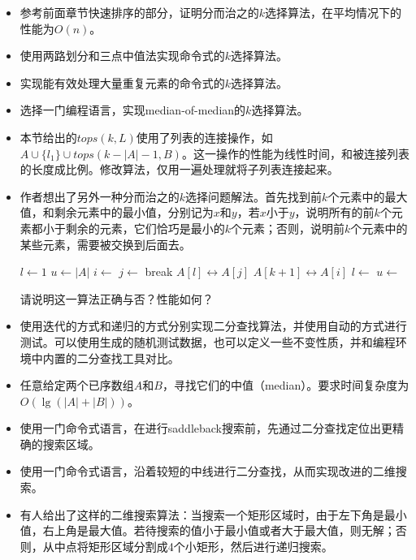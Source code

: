 \documentclass[UTF8]{article}
\begin{document}
\begin{Exercise}
\begin{itemize}
\item 参考前面章节快速排序的部分，证明分而治之的$k$选择算法，在平均情况下的性能为$O(n)$。
\item 使用两路划分和三点中值法实现命令式的$k$选择算法。
\item 实现能有效处理大量重复元素的命令式的$k$选择算法。
\item 选择一门编程语言，实现median-of-median的$k$选择算法。
\item 本节给出的$tops(k, L)$使用了列表的连接操作，如$A \cup \{ l_1 \} \cup tops(k - |A| - 1, B)$。这一操作的性能为线性时间，和被连接列表的长度成比例。修改算法，仅用一遍处理就将子列表连接起来。
\item 作者想出了另外一种分而治之的$k$选择问题解法。首先找到前$k$个元素中的最大值，和剩余元素中的最小值，分别记为$x$和$y$，若$x$小于$y$，说明所有的前$k$个元素都小于剩余的元素，它们恰巧是最小的$k$个元素；否则，说明前$k$个元素中的某些元素，需要被交换到后面去。
\begin{algorithmic}[1]
  \State $l \gets 1$
  \State $u \gets |A|$
  \Loop
    \State $i \gets$ 
    \State $j \gets$ 
      \State break
    \EndIf
    \State {} $A[l] \leftrightarrow A[j]$
    \State {} $A[k+1] \leftrightarrow A[i]$
    \State $l \gets$ 
    \State $u \gets$ 
  \EndLoop
\EndProcedure
\end{algorithmic}
请说明这一算法正确与否？性能如何？
\item 使用迭代的方式和递归的方式分别实现二分查找算法，并使用自动的方式进行测试。可以使用生成的随机测试数据，也可以定义一些不变性质，并和编程环境中内置的二分查找工具对比。
\item 任意给定两个已序数组$A$和$B$，寻找它们的中值（median）。要求时间复杂度为$O(\lg (|A| + |B|))$。
\item 使用一门命令式语言，在进行saddleback搜索前，先通过二分查找定位出更精确的搜索区域。
\item 使用一门命令式语言，沿着较短的中线进行二分查找，从而实现改进的二维搜索。
\item 有人给出了这样的二维搜索算法：当搜索一个矩形区域时，由于左下角是最小值，右上角是最大值。若待搜索的值小于最小值或者大于最大值，则无解；否则，从中点将矩形区域分割成4个小矩形，然后进行递归搜索。
\begin{algorithmic}[1]
 

\end{algorithmic}
\end{itemize}
\end{Exercise}
\end{document}
